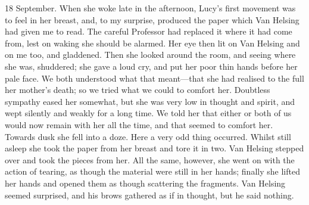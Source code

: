 \begin{diary}{18 September.}
When she woke late in the afternoon, Lucy's first movement was to feel in her breast, and, to my surprise, produced the paper which Van Helsing had given me to read. The careful Professor had replaced it where it had come from, lest on waking she should be alarmed. Her eye then lit on Van Helsing and on me too, and gladdened. Then she looked around the room, and seeing where she was, shuddered; she gave a loud cry, and put her poor thin hands before her pale face. We both understood what that meant—that she had realised to the full her mother's death; so we tried what we could to comfort her. Doubtless sympathy eased her somewhat, but she was very low in thought and spirit, and wept silently and weakly for a long time. We told her that either or both of us would now remain with her all the time, and that seemed to comfort her. Towards dusk she fell into a doze. Here a very odd thing occurred. Whilst still asleep she took the paper from her breast and tore it in two. Van Helsing stepped over and took the pieces from her. All the same, however, she went on with the action of tearing, as though the material were still in her hands; finally she lifted her hands and opened them as though scattering the fragments. Van Helsing seemed surprised, and his brows gathered as if in thought, but he said nothing.
\end{diary}
 

